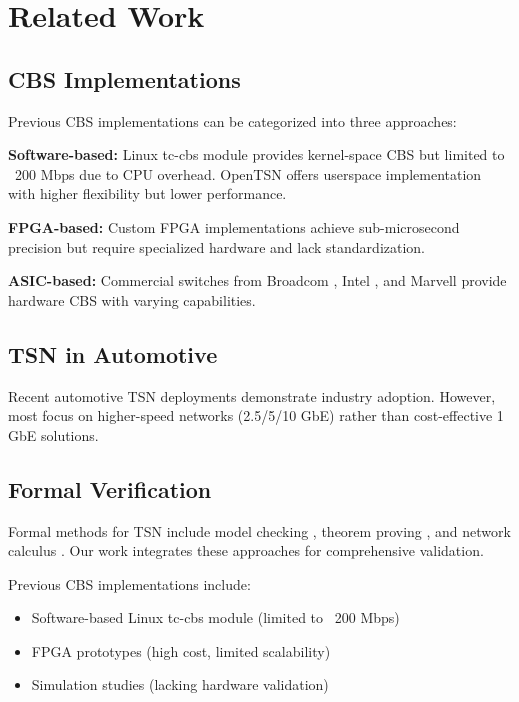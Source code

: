 \documentclass[10pt, journal, compsoc]{IEEEtran}
\begin{document}
\section{Related Work}

\subsection{CBS Implementations}

Previous CBS implementations can be categorized into three approaches:

\textbf{Software-based:} Linux tc-cbs module \cite{linux_cbs} provides kernel-space CBS but limited to ~200 Mbps due to CPU overhead. OpenTSN \cite{opentsn} offers userspace implementation with higher flexibility but lower performance.

\textbf{FPGA-based:} Custom FPGA implementations \cite{fpga_cbs} achieve sub-microsecond precision but require specialized hardware and lack standardization.

\textbf{ASIC-based:} Commercial switches from Broadcom \cite{broadcom_tsn}, Intel \cite{intel_tsn}, and Marvell \cite{marvell_tsn} provide hardware CBS with varying capabilities.

\subsection{TSN in Automotive}

Recent automotive TSN deployments \cite{bmw_tsn, mercedes_tsn} demonstrate industry adoption. However, most focus on higher-speed networks (2.5/5/10 GbE) rather than cost-effective 1 GbE solutions.

\subsection{Formal Verification}

Formal methods for TSN include model checking \cite{uppaal_tsn}, theorem proving \cite{isabelle_tsn}, and network calculus \cite{rtc_tsn}. Our work integrates these approaches for comprehensive validation.

Previous CBS implementations include:
\begin{itemize}
    \item Software-based Linux tc-cbs module (limited to ~200 Mbps)
    \item FPGA prototypes (high cost, limited scalability)
    \item Simulation studies (lacking hardware validation)
\end{itemize}
\end{document}
